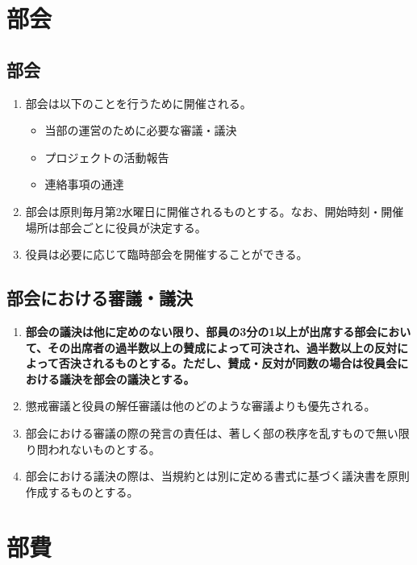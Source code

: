\documentclass[12pt, unicode, a4paper]{ltjsreport}
\begin{document}
\chapter{部会}
    \section{部会}\label{meeting}
        \begin{enumerate}
            \item 部会は以下のことを行うために開催される。
            \begin{itemize}
                \item 当部の運営のために必要な審議・議決
                \item プロジェクトの活動報告
                \item 連絡事項の通達
            \end{itemize}
            \item 部会は原則毎月第2水曜日に開催されるものとする。なお、開始時刻・開催場所は部会ごとに役員が決定する。
            \item 役員は必要に応じて臨時部会を開催することができる。
        \end{enumerate}

    \section{部会における審議・議決}\label{decision}
        \begin{enumerate}
            \item {\bf 部会の議決は他に定めのない限り、部員の3分の1以上が出席する部会において、その出席者の過半数以上の賛成によって可決され、過半数以上の反対によって否決されるものとする。ただし、賛成・反対が同数の場合は役員会における議決を部会の議決とする。}
            \item 懲戒審議と役員の解任審議は他のどのような審議よりも優先される。
            \item 部会における審議の際の発言の責任は、著しく部の秩序を乱すもので無い限り問われないものとする。
            \item 部会における議決の際は、当規約とは別に定める書式に基づく議決書を原則作成するものとする。
        \end{enumerate}


\chapter{部費}
\end{document}
